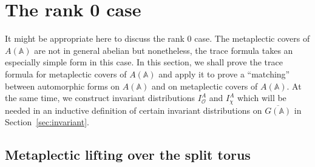 \section{The rank 0 case}\label{sec:rank0}

It might be appropriate here to discuss the rank 0 case. The metaplectic
covers of $A(\mathbb{A})$ are not in general abelian but nonetheless, the
trace formula takes an especially simple form in this case. In this section,
we shall prove the trace formula for metaplectic covers of $A({\mathbb{A}})$ and
apply it to prove a ``matching'' between automorphic forms on $A({\mathbb{A}})$
and on metaplectic covers of $A({\mathbb{A}})$. At the same time, we construct
invariant distributions $I_{\mathcal{O}}^A$ and $I_\chi ^A$ which will be
needed in an inductive definition of certain invariant distributions
on $\overline{G({\mathbb{A}})}$ in Section~\ref{sec:invariant}. 

\subsection{Metaplectic lifting over the split torus}\label{ssec:rank0lift}

